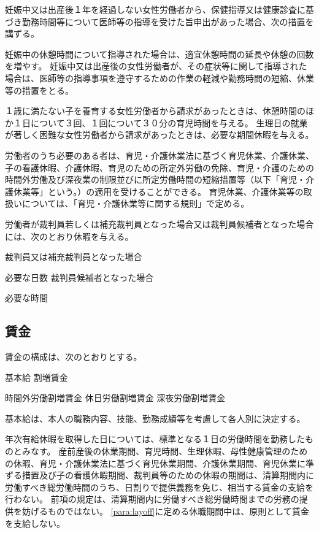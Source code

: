 \documentclass[10pt,a4paper,uplatex]{jsarticle}
\begin{document}
\term
妊娠中又は出産後１年を経過しない女性労働者から、保健指導又は健康診査に基づき勤務時間等について医師等の指導を受けた旨申出があった場合、次の措置を講ずる。
\begin{enumerate}
    \itm 妊娠中の休憩時間について指導された場合は、適宜休憩時間の延長や休憩の回数を増やす。
    \itm 妊娠中又は出産後の女性労働者が、その症状等に関して指導された場合は、医師等の指導事項を遵守するための作業の軽減や勤務時間の短縮、休業等の措置をとる。
\end{enumerate}

１歳に満たない子を養育する女性労働者から請求があったときは、休憩時間のほか１日について３回、１回について３０分の育児時間を与える。
\term
生理日の就業が著しく困難な女性労働者から請求があったときは、必要な期間休暇を与える。

労働者のうち必要のある者は、育児・介護休業法に基づく育児休業、介護休業、子の看護休暇、介護休暇、育児のための所定外労働の免除、育児・介護のための時間外労働及び深夜業の制限並びに所定労働時間の短縮措置等（以下「育児・介護休業等」という。）の適用を受けることができる。
\term
育児休業、介護休業等の取扱いについては、「育児・介護休業等に関する規則」で定める。

労働者が裁判員若しくは補充裁判員となった場合又は裁判員候補者となった場合には、次のとおり休暇を与える。
\begin{enumerate}
    \itm 裁判員又は補充裁判員となった場合 \par 必要な日数
    \itm 裁判員候補者となった場合\par 必要な時間
\end{enumerate}


\subsection{賃金}

賃金の構成は、次のとおりとする。
\begin{enumerate}
    \itm 基本給
    \itm 割増賃金
    \begin{enumerate}
        \itm 時間外労働割増賃金
        \itm 休日労働割増賃金
        \itm 深夜労働割増賃金
    \end{enumerate}
\end{enumerate}

基本給は、本人の職務内容、技能、勤務成績等を考慮して各人別に決定する。

年次有給休暇を取得した日については、標準となる１日の労働時間を勤務したものとみなす。
\term
産前産後の休業期間、育児時間、生理休暇、母性健康管理のための休暇、育児・介護休業法に基づく育児休業期間、介護休業期間、育児休業に準ずる措置及び子の看護休暇期間、裁判員等のための休暇の期間は、清算期間内に労働すべき総労働時間のうち、日割りで提供義務を免じ、相当する賃金の支給を行わない。 
\term
前項の規定は、清算期間内に労働すべき総労働時間までの労務の提供を妨げるものではない。
\term
\ref{para:layoff}に定める休職期間中は、原則として賃金を支給しない。
\end{document}
